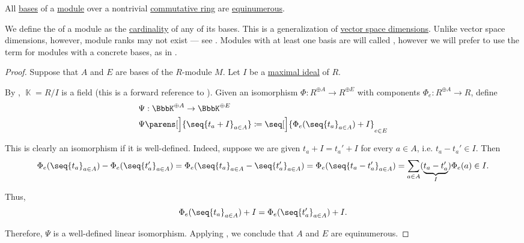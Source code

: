 \begin{proposition}\label{thm:commutative_module_rank}
  All \hyperref[def:hamel_basis]{bases} of a \hyperref[def:module]{module} over a nontrivial \hyperref[def:ring/commutative]{commutative ring} are \hyperref[def:equinumerosity]{equinumerous}.

  We define the  of a module as the \hyperref[thm:cardinality_existence]{cardinality} of any of its bases. This is a generalization of \hyperref[thm:vector_space_dimension]{vector space dimensions}. Unlike vector space dimensions, however, module ranks may not exist --- see . Modules with at least one basis are will called , however we will prefer to use the term for modules with a concrete bases, as in .
\end{proposition}
\begin{proof}
  Suppose that \( A \) and \( E \) are bases of the \( R \)-module \( M \). Let \( I \) be a \hyperref[def:semiring_ideal/maximal]{maximal ideal} of \( R \).

  By , \( \BbbK = R / I \) is a field (this is a forward reference to ). Given an isomorphism \( \Phi: R^{\oplus A} \to R^{\oplus E} \) with components \( \Phi_e: R^{\oplus A} \to R \), define
  \begin{equation*}
    \begin{aligned}
      &\Psi: \BbbK^{\oplus A} \to \BbbK^{\oplus E} \\
      &\Psi\parens[\Big]{ \seq{ t_a + I }_{a \in A} } \coloneqq \seq[\Big]{ \Phi_e(\seq{ t_a }_{a \in A}) + I }_{e \in E}
    \end{aligned}
  \end{equation*}

  This is clearly an isomorphism if it is well-defined. Indeed, suppose we are given \( t_a + I = t_a' + I \) for every \( a \in A \), i.e. \( t_a - t_a' \in I \). Then
  \small
  \begin{equation*}
    \Phi_e(\seq{ t_a }_{a \in A}) - \Phi_e(\seq{ t_a' }_{a \in A})
    =
    \Phi_e(\seq{ t_a }_{a \in A} - \seq{ t_a' }_{a \in A})
    =
    \Phi_e(\seq{ t_a - t_a' }_{a \in A})
    =
    \sum_{a \in A} (\underbrace{ t_a - t_a' }_I) \Phi_e(a)
    \in
    I.
  \end{equation*}
  \normalsize

  Thus,
  \begin{equation*}
    \Phi_e(\seq{ t_a }_{a \in A}) + I = \Phi_e(\seq{ t_a' }_{a \in A}) + I.
  \end{equation*}

  Therefore, \( \Psi \) is a well-defined linear isomorphism. Applying , we conclude that \( A \) and \( E \) are equinumerous.
\end{proof}

